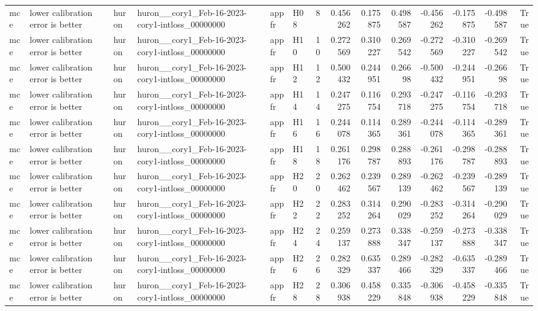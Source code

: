\begin{longtable}{llllllrrrrrrrr}
mce & lower calibration error is better & huron & huron\_\_cory1\_Feb-16-2023-cory1-intloss\_00000000 & appfr & H08 & 8 & 0.456262 & 0.175875 & 0.498587 & -0.456262 & -0.175875 & -0.498587 & True \\
mce & lower calibration error is better & huron & huron\_\_cory1\_Feb-16-2023-cory1-intloss\_00000000 & appfr & H10 & 10 & 0.272569 & 0.310227 & 0.269542 & -0.272569 & -0.310227 & -0.269542 & True \\
mce & lower calibration error is better & huron & huron\_\_cory1\_Feb-16-2023-cory1-intloss\_00000000 & appfr & H12 & 12 & 0.500432 & 0.244951 & 0.26698 & -0.500432 & -0.244951 & -0.26698 & True \\
mce & lower calibration error is better & huron & huron\_\_cory1\_Feb-16-2023-cory1-intloss\_00000000 & appfr & H14 & 14 & 0.247275 & 0.116754 & 0.293718 & -0.247275 & -0.116754 & -0.293718 & True \\
mce & lower calibration error is better & huron & huron\_\_cory1\_Feb-16-2023-cory1-intloss\_00000000 & appfr & H16 & 16 & 0.244078 & 0.114365 & 0.289361 & -0.244078 & -0.114365 & -0.289361 & True \\
mce & lower calibration error is better & huron & huron\_\_cory1\_Feb-16-2023-cory1-intloss\_00000000 & appfr & H18 & 18 & 0.261176 & 0.298787 & 0.288893 & -0.261176 & -0.298787 & -0.288893 & True \\
mce & lower calibration error is better & huron & huron\_\_cory1\_Feb-16-2023-cory1-intloss\_00000000 & appfr & H20 & 20 & 0.262462 & 0.239567 & 0.289139 & -0.262462 & -0.239567 & -0.289139 & True \\
mce & lower calibration error is better & huron & huron\_\_cory1\_Feb-16-2023-cory1-intloss\_00000000 & appfr & H22 & 22 & 0.283252 & 0.314264 & 0.290029 & -0.283252 & -0.314264 & -0.290029 & True \\
mce & lower calibration error is better & huron & huron\_\_cory1\_Feb-16-2023-cory1-intloss\_00000000 & appfr & H24 & 24 & 0.259137 & 0.273888 & 0.338347 & -0.259137 & -0.273888 & -0.338347 & True \\
mce & lower calibration error is better & huron & huron\_\_cory1\_Feb-16-2023-cory1-intloss\_00000000 & appfr & H26 & 26 & 0.282329 & 0.635337 & 0.289466 & -0.282329 & -0.635337 & -0.289466 & True \\
mce & lower calibration error is better & huron & huron\_\_cory1\_Feb-16-2023-cory1-intloss\_00000000 & appfr & H28 & 28 & 0.306938 & 0.458229 & 0.335848 & -0.306938 & -0.458229 & -0.335848 & True \\

\end{longtable}
